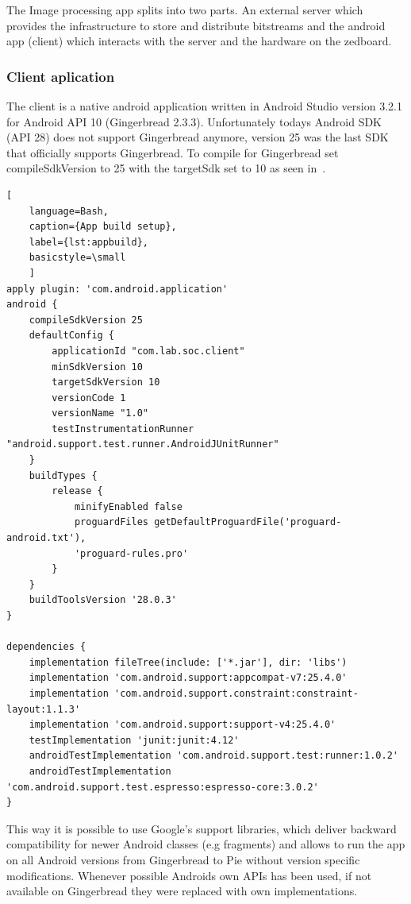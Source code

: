 The Image processing app splits into two parts. An external server which provides the infrastructure to store and distribute bitstreams and 
the android app (client) which interacts with the server and the hardware on the zedboard. 

\subsubsection{Client aplication}

The client is a native android application written in Android Studio version 3.2.1 for Android API 10 (Gingerbread 2.3.3).
Unfortunately todays Android SDK (API 28) does not support Gingerbread anymore, version 25 was the last SDK that officially supports Gingerbread. To compile for Gingerbread set compileSdkVersion to 25 with the
targetSdk set to 10 as seen in~.
\begin{lstlisting}[
	language=Bash,
	caption={App build setup},
	label={lst:appbuild},
	basicstyle=\small
	]
apply plugin: 'com.android.application'
android {
    compileSdkVersion 25
    defaultConfig {
        applicationId "com.lab.soc.client"
        minSdkVersion 10
        targetSdkVersion 10
        versionCode 1
        versionName "1.0"
        testInstrumentationRunner "android.support.test.runner.AndroidJUnitRunner"
    }
    buildTypes {
        release {
            minifyEnabled false
            proguardFiles getDefaultProguardFile('proguard-android.txt'), 
            'proguard-rules.pro'
        }
    }
    buildToolsVersion '28.0.3'
}

dependencies {
    implementation fileTree(include: ['*.jar'], dir: 'libs')
    implementation 'com.android.support:appcompat-v7:25.4.0'
    implementation 'com.android.support.constraint:constraint-layout:1.1.3'
    implementation 'com.android.support:support-v4:25.4.0'
    testImplementation 'junit:junit:4.12'
    androidTestImplementation 'com.android.support.test:runner:1.0.2'
    androidTestImplementation 'com.android.support.test.espresso:espresso-core:3.0.2'
}    
\end{lstlisting}
This way it is possible to use Google's support libraries, which deliver
backward compatibility for newer Android classes (e.g fragments) and allows to run the app on all Android versions from Gingerbread to Pie without version specific modifications. Whenever possible Androids own APIs has been used, if not available on Gingerbread they were replaced with own implementations.\newline

